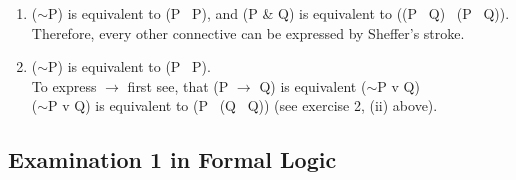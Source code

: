\documentclass[a4paper,12pt]{article}
\newcommand{\mra}{$\rightarrow$ }
\newcommand{\ms}{$\sim$}
\newcommand{\tb}{\textbar \ }
\begin{document}
\begin{enumerate}[label=\arabic*,leftmargin=*]
\begin{enumerate}[label=(\roman*)]
            \end{enumerate}

        \item (\ms P) is equivalent to (P \tb P), and (P \& Q) is equivalent to ((P \tb Q) \tb (P \tb Q)). Therefore, every other connective can be expressed by Sheffer's stroke.

        \item (\ms P) is equivalent to (P \tb P).\\
            To express \mra first see, that (P \mra Q) is equivalent (\ms P v Q)\\
            (\ms P v Q) is equivalent to (P \tb (Q \tb Q)) (see exercise 2, (ii) above).

    \end{enumerate}

    \subsection*{Examination 1 in Formal Logic}
\end{document}
